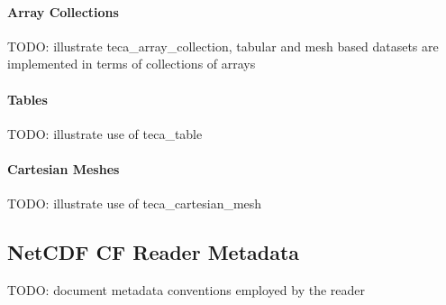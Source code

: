 \documentclass[a4paper,10pt,DIV=12]{scrreprt}
\begin{document}
\paragraph{Array Collections}
TODO: illustrate teca\_array\_collection, tabular and mesh based datasets are implemented in terms of collections of arrays

\paragraph{Tables}
TODO: illustrate use of teca\_table

\paragraph{Cartesian Meshes}
TODO: illustrate use of teca\_cartesian\_mesh

\subsection{NetCDF CF Reader Metadata}
\label{sec:cf_reader}
TODO: document metadata conventions employed by the reader


%

\end{document}
